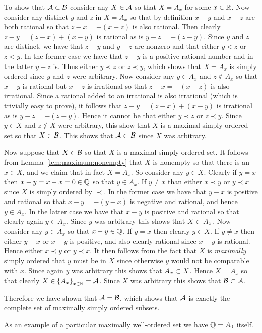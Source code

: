 {{    To show that $\cA \ss \cB$ consider any $X \in \cA$ so that $X = A_x$ for some $x \in \reals$.
    Now consider any distinct $y$ and $z$ in $X = A_x$ so that by definition $x - y$ and $x - z$ are both rational so that $z - x = -(x-z)$ is also rational.
    Then clearly $z - y = (z-x) + (x-y)$ is rational as is $y - z = -(z-y)$.
    Since $y$ and $z$ are distinct, we have that $z-y$ and $y-z$ are nonzero and that either $y < z$ or $z < y$.
    In the former case we have that $z - y$ is a positive rational number and in the latter $y - z$ is.
    Thus either $y \prec z$ or $z \prec y$, which shows that $X = A_x$ is simply ordered since $y$ and $z$ were arbitrary.
    Now consider any $y \in A_x$ and $z \notin A_x$ so that $x-y$ is rational but $x-z$ is irrational so that $z-x=-(x-z)$ is also irrational.
    Since a rational added to an irrational is also irrational (which is trivially easy to prove), it follows that $z - y = (z-x) + (x-y)$ is irrational as is $y-z = -(z-y)$.
    Hence it cannot be that either $y \prec z$ or $z \prec y$.
    Since $y \in X$ and $z \notin X$ were arbitrary, this show that $X$ is a maximal simply ordered set so that $X \in \cB$.
    This shows that $\cA \ss \cB$ since $X$ was arbitrary.

    Now suppose that $X \in \cB$ so that $X$ is a maximal simply ordered set.
    It follows from Lemma~\ref{lem:maximum:nonempty} that $X$ is nonempty so that there is an $x \in X$, and we claim that in fact $X = A_x$.
    So consider any $y \in X$.
    Clearly if $y = x$ then $x-y = x-x = 0 \in \rats$ so that $y \in A_x$.
    If $y \neq x$ than either $x \prec y$ or $y \prec x$ since $X$ is simply ordered by $\prec$.
    In the former case we have that $y-x$ is positive and rational so that $x-y = -(y-x)$ is negative and rational, and hence $y \in A_x$.
    In the latter case we have that $x-y$ is positive and rational so that clearly again $y \in A_x$.
    Since $y$ was arbitrary this shows that $X \ss A_x$.
    Now consider any $y \in A_x$ so that $x-y \in \rats$.
    If $y = x$ then clearly $y \in X$.
    If $y \neq x$ then either $y-x$ or $x-y$ is positive, and also clearly rational since $x-y$ is rational.
    Hence either $x \prec y$ or $y \prec x$.
    It then follows from the fact that $X$ is \emph{maximally} simply ordered that $y$ must be in $X$ since otherwise $y$ would not be comparable with $x$.
    Since again $y$ was arbitrary this shows that $A_x \ss X$.
    Hence $X = A_x$ so that clearly $X \in \braces{A_x}_{x \in \reals} = \cA$.
    Since $X$ was arbitrary this shows that $\cB \ss \cA$.

    Therefore we have shown that $\cA = \cB$, which shows that $\cA$ is exactly the complete set of maximally simply ordered subsets.
  }

  As an example of a particular maximally well-ordered set we have $\rats = A_0$ itself.
}

